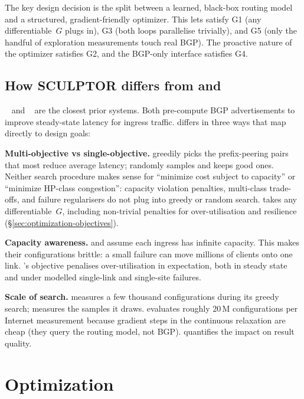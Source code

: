 \documentclass[acmsmall,anonymous,review,nonacm,10pt]{acmart}
\begin{document}
The key design decision is the split between a learned, black-box
routing model and a structured, gradient-friendly optimizer.  This
lets \sparse satisfy G1 (any differentiable~$G$ plugs in), G3
(both loops parallelise trivially), and G5 (only the handful of
exploration measurements touch real BGP).  The proactive nature of
the optimizer satisfies G2, and the BGP-only interface satisfies G4.

\subsection{How SCULPTOR differs from \painter and \anyopt}
\label{sec:design-differentiation}

\painter~\cite{painter} and \anyopt~\cite{anyopt} are the
closest prior systems.  Both pre-compute BGP advertisements to
improve steady-state latency for ingress traffic.  \sparse differs
in three ways that map directly to design goals:

\noindent\textbf{Multi-objective vs single-objective.}  \painter
greedily picks the prefix-peering pairs that most reduce average
latency; \anyopt randomly samples and keeps good ones.  Neither
search procedure makes sense for ``minimize cost subject to
capacity'' or ``minimize HP-class congestion'': capacity violation
penalties, multi-class trade-offs, and failure regularisers do not
plug into greedy or random search.  \sparse takes any
differentiable~$G$, including non-trivial penalties for over-utilisation
and resilience (\S\ref{sec:optimization-objectives}).

\noindent\textbf{Capacity awareness.}  \painter and \anyopt assume
each ingress has infinite capacity.  This makes their
configurations brittle: a small failure can move millions of clients
onto one link.  \sparse's objective penalises over-utilisation in
expectation, both in steady state and under modelled single-link
and single-site failures.

\noindent\textbf{Scale of search.}  \painter measures a few thousand
configurations during its greedy search; \anyopt measures the
samples it draws.  \sparse evaluates roughly $20$\,M configurations
per Internet measurement because gradient steps in the continuous
relaxation are cheap (they query the routing model, not BGP).
 quantifies the impact on result quality.

\section{Optimization}
\label{sec:optimization}
\end{document}
